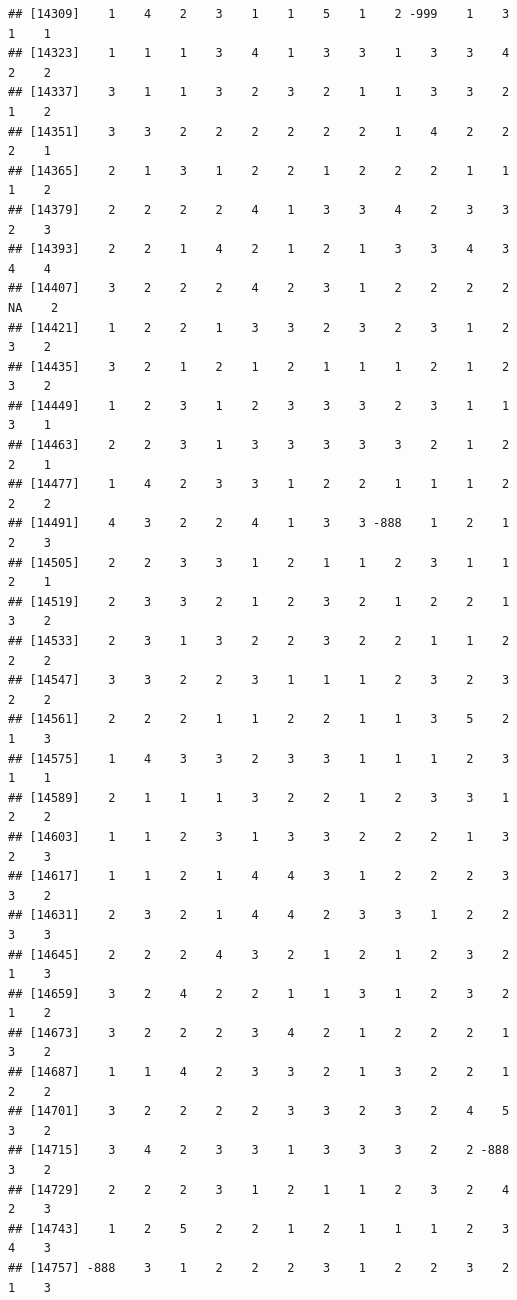 \documentclass[
  12pt,
  openany]{book}
\begin{document}
\begin{verbatim}
## [14309]    1    4    2    3    1    1    5    1    2 -999    1    3    1    1
## [14323]    1    1    1    3    4    1    3    3    1    3    3    4    2    2
## [14337]    3    1    1    3    2    3    2    1    1    3    3    2    1    2
## [14351]    3    3    2    2    2    2    2    2    1    4    2    2    2    1
## [14365]    2    1    3    1    2    2    1    2    2    2    1    1    1    2
## [14379]    2    2    2    2    4    1    3    3    4    2    3    3    2    3
## [14393]    2    2    1    4    2    1    2    1    3    3    4    3    4    4
## [14407]    3    2    2    2    4    2    3    1    2    2    2    2   NA    2
## [14421]    1    2    2    1    3    3    2    3    2    3    1    2    3    2
## [14435]    3    2    1    2    1    2    1    1    1    2    1    2    3    2
## [14449]    1    2    3    1    2    3    3    3    2    3    1    1    3    1
## [14463]    2    2    3    1    3    3    3    3    3    2    1    2    2    1
## [14477]    1    4    2    3    3    1    2    2    1    1    1    2    2    2
## [14491]    4    3    2    2    4    1    3    3 -888    1    2    1    2    3
## [14505]    2    2    3    3    1    2    1    1    2    3    1    1    2    1
## [14519]    2    3    3    2    1    2    3    2    1    2    2    1    3    2
## [14533]    2    3    1    3    2    2    3    2    2    1    1    2    2    2
## [14547]    3    3    2    2    3    1    1    1    2    3    2    3    2    2
## [14561]    2    2    2    1    1    2    2    1    1    3    5    2    1    3
## [14575]    1    4    3    3    2    3    3    1    1    1    2    3    1    1
## [14589]    2    1    1    1    3    2    2    1    2    3    3    1    2    2
## [14603]    1    1    2    3    1    3    3    2    2    2    1    3    2    3
## [14617]    1    1    2    1    4    4    3    1    2    2    2    3    3    2
## [14631]    2    3    2    1    4    4    2    3    3    1    2    2    3    3
## [14645]    2    2    2    4    3    2    1    2    1    2    3    2    1    3
## [14659]    3    2    4    2    2    1    1    3    1    2    3    2    1    2
## [14673]    3    2    2    2    3    4    2    1    2    2    2    1    3    2
## [14687]    1    1    4    2    3    3    2    1    3    2    2    1    2    2
## [14701]    3    2    2    2    2    3    3    2    3    2    4    5    3    2
## [14715]    3    4    2    3    3    1    3    3    3    2    2 -888    3    2
## [14729]    2    2    2    3    1    2    1    1    2    3    2    4    2    3
## [14743]    1    2    5    2    2    1    2    1    1    1    2    3    4    3
## [14757] -888    3    1    2    2    2    3    1    2    2    3    2    1    3

\end{verbatim}
\end{document}
